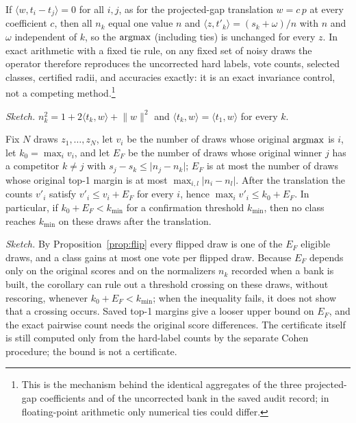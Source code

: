 \begin{corollary}
\label{cor:chowers}
If $\langle w,t_i-t_j\rangle=0$ for all $i,j$, as for the projected-gap
translation $w=c\,p$ at every coefficient $c$, then all $n_k$ equal one value
$n$ and $\langle z,t'_k\rangle=(s_k+\omega)/n$ with $n$ and $\omega$ independent of $k$,
so the $\operatorname{argmax}$ (including ties) is unchanged for every $z$. In exact
arithmetic with a fixed tie rule, on any fixed set of noisy draws the operator
therefore reproduces the uncorrected hard labels,
vote counts, selected classes, certified radii, and accuracies exactly: it is
an exact invariance control, not a competing method.\footnote{This is the
mechanism behind the identical aggregates of the three projected-gap
coefficients and of the uncorrected bank in the saved audit record; in
floating-point arithmetic only numerical ties could differ.}
\end{corollary}
\noindent\emph{Sketch.} $n_k^2=1+2\langle t_k,w\rangle+\lVert w\rVert^2$ and
$\langle t_k,w\rangle=\langle t_1,w\rangle$ for every $k$.

\begin{corollary}
\label{cor:budget}
Fix $N$ draws $z_1,\dots,z_N$, let $v_i$ be the number of draws whose original
$\operatorname{argmax}$ is $i$, let $k_0=\max_i v_i$, and let $E_F$ be the number of draws
whose original winner $j$ has a competitor $k\ne j$ with
$s_j-s_k\le\lvert n_j-n_k\rvert$; $E_F$ is at most the number of draws whose
original top-1 margin is at most $\max_{i,l}\lvert n_i-n_l\rvert$. After the
translation the counts $v'_i$ satisfy $v'_i\le v_i+E_F$ for every $i$, hence
$\max_i v'_i\le k_0+E_F$. In particular, if $k_0+E_F<k_{\min}$ for a
confirmation threshold $k_{\min}$, then no class reaches $k_{\min}$ on these
draws after the translation.
\end{corollary}
\noindent\emph{Sketch.} By Proposition~\ref{prop:flip} every flipped draw is
one of the $E_F$ eligible draws, and a class gains at most one vote per flipped
draw. Because $E_F$ depends only on the original scores and on the normalizers
$n_k$ recorded when a bank is built, the corollary can rule out a threshold
crossing on these draws, without rescoring, whenever $k_0+E_F<k_{\min}$; when
the inequality fails, it does not show that a crossing occurs. Saved top-1
margins give a looser upper bound on $E_F$, and the exact pairwise count needs
the original score differences. The certificate itself is still computed only
from the hard-label counts by the separate Cohen procedure; the bound is not a
certificate.

